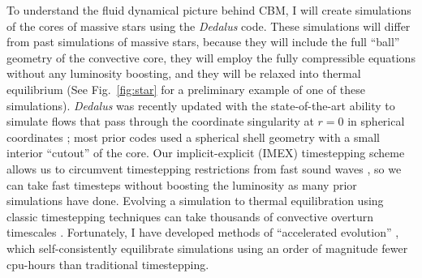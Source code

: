 \documentclass[12pt]{article}
\begin{document}
To understand the fluid dynamical picture behind CBM, I will create simulations of the cores of massive stars using the \emph{Dedalus} \citep{burns_etal_2020} code.
These simulations will differ from past simulations of massive stars, because they will include the full ``ball'' geometry of the convective core, they will employ the fully compressible equations without any luminosity boosting, and they will be relaxed into thermal equilibrium (See Fig.~\ref{fig:star} for a preliminary example of one of these simulations).
\emph{Dedalus} was recently updated with the state-of-the-art ability to simulate flows that pass through the coordinate singularity at $r = 0$ in spherical coordinates \citep{vasil_etal_2019,lecoanet_etal_2019}; most prior codes used a spherical shell geometry with a small interior ``cutout'' of the core.
Our implicit-explicit (IMEX) timestepping scheme allows us to circumvent timestepping restrictions from fast sound waves \citep{anders_brown_2017}, so we can take fast timesteps without boosting the luminosity as many prior simulations have done.
Evolving a simulation to thermal equilibration using classic timestepping techniques can take thousands of convective overturn timescales \citep{anders_etal_2022a,anders_etal_2022b}.
Fortunately, I have developed methods of ``accelerated evolution'' \citep{anders_etal_2018}, which self-consistently equilibrate simulations using an order of magnitude fewer cpu-hours than traditional timestepping.
\end{document}
